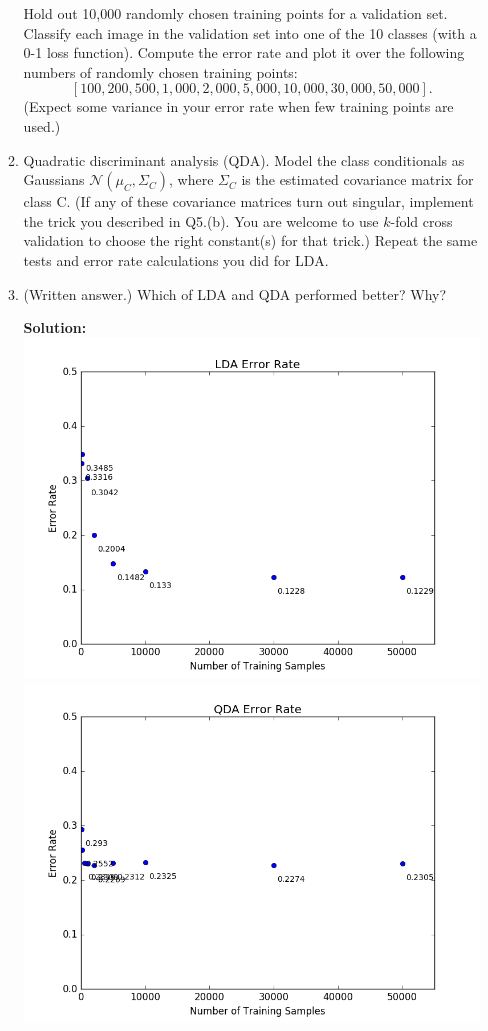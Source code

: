 \documentclass{article}
\newcommand{\solution}{\textbf{Solution: }}
\newcommand{\N}{\mathcal{N}}
\begin{document}
\begin{enumerate}[label=(\alph*)]
\begin{enumerate}[label=(\roman*)]
        Hold out 10,000 randomly chosen training points for a validation set. Classify each image in the validation set into one of the 10 classes (with a 0-1 loss function). Compute the error rate and plot it over the following numbers of randomly chosen training points: $$[100, 200, 500, 1,000, 2,000, 5,000, 10,000, 30,000, 50,000].$$ (Expect some variance in your error rate when few training points are used.)
        
        \item Quadratic discriminant analysis (QDA). Model the class conditionals as Gaussians $\N(\mu_C, \Sigma_C)$, where $\Sigma_C$ is the estimated covariance matrix for class C. (If any of these covariance matrices turn out singular, implement the trick you described in Q5.(b). You are welcome to use $k$-fold cross validation to choose the right constant(s) for that trick.) Repeat the same tests and error rate calculations you did for LDA.
\newpage        
        \item  (Written answer.) Which of LDA and QDA performed better? Why?
        \begin{mdframed} \solution\\
        \includegraphics[scale=.5]{images/digit_lda.png}\\
        \includegraphics[scale=.5]{images/digit_qda.png}
               

\end{mdframed}
\end{enumerate}
\end{enumerate}
\end{document}
